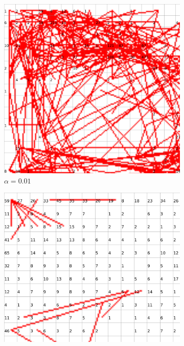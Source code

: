 \documentclass{acm_proc_article-sp}
\begin{document}
\begin{figure}
\centering
    \centering
    \begin{subfigure}[b]{0.24\linewidth}
        \includegraphics[width=\linewidth]{img/wine-20x16-distortion-sqrt-2-alpha-0.01}
        \caption{$\alpha=0.01$}
        \label{fig:wine-20x16-distortion-sqrt-2-alpha-0.01}
    \end{subfigure}
    \begin{subfigure}[b]{0.24\linewidth}
        \includegraphics[width=\linewidth]{img/wine-20x16-distortion-sqrt-2-alpha-0.45}

\end{subfigure}
\end{figure}
\end{document}
